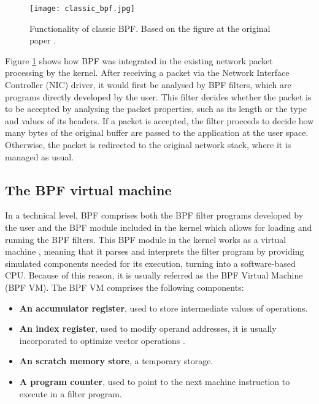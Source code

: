 \begin{figure}[htbp]
	\centering
	\texttt{[image: classic\_bpf.jpg]}
	\caption{Functionality of classic BPF. Based on the figure at the original paper \cite{bpf_bsd_origin_bpf_page2}.}
	\label{fig:classif_bpf}
\end{figure}

Figure \ref{fig:classif_bpf} shows how BPF was integrated in the existing network packet processing by the kernel. After receiving a packet via the Network Interface Controller (NIC) driver, it would first be analysed by BPF filters, which are programs directly developed by the user. This filter decides whether the packet is to be accepted by analysing the packet properties, such as its length or the type and values of its headers. If a packet is accepted, the filter proceeds to decide how many bytes of the original buffer are passed to the application at the user space. Otherwise, the packet is redirected to the original network stack, where it is managed as usual.


\subsection{The BPF virtual machine} \label{subsection:bpf_vm}
In a technical level, BPF comprises both the BPF filter programs developed by the user and the BPF module included in the kernel which allows for loading and running the BPF filters. This BPF module in the kernel works as a virtual machine \cite{bpf_bsd_origin_bpf_page1}, meaning that it parses and interprets the filter program by providing simulated components needed for its execution, turning into a software-based CPU. Because of this reason, it is usually referred as the BPF Virtual Machine (BPF VM). The BPF VM comprises the following components:
\begin{itemize}
\item \textbf{An accumulator register}, used to store intermediate values of operations.
\item \textbf{An index register}, used to modify operand addresses, it is usually incorporated to optimize vector operations \cite{index_register}.
\item \textbf{An scratch memory store}, a temporary storage.
\item \textbf{A program counter}, used to point to the next machine instruction to execute in a filter program.
\end{itemize}


